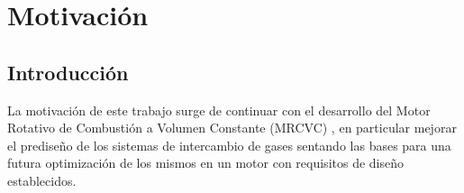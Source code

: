 
\chapter{Motivación}
\label{capitulo1}

\section{Introducción}
La motivación de este trabajo surge de continuar con el desarrollo del Motor
Rotativo de Combustión a Volumen Constante (MRCVC) \cite{toth}, en particular
mejorar el prediseño de los sistemas de intercambio de gases sentando las bases
para una futura optimización de los mismos en un motor con requisitos de diseño
establecidos.

